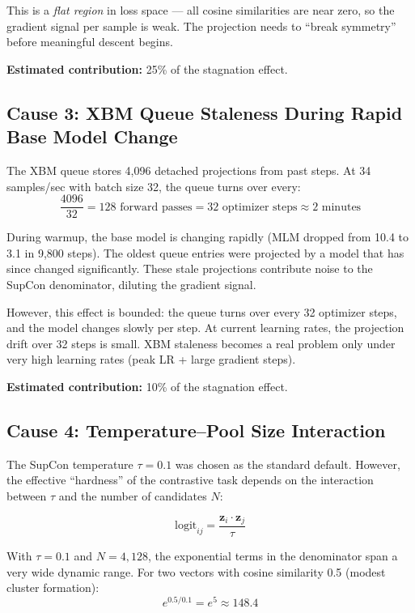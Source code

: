 \documentclass[11pt,a4paper]{article}
\begin{document}
This is a \emph{flat region} in loss space --- all cosine similarities are near zero,
so the gradient signal per sample is weak. The projection needs to ``break symmetry''
before meaningful descent begins.

\medskip
\noindent\textbf{Estimated contribution:} 25\% of the stagnation effect.

\subsection{Cause 3: XBM Queue Staleness During Rapid Base Model Change}
\label{sec:cause3}

The XBM queue stores 4{,}096 detached projections from past steps. At 34\,samples/sec
with batch size 32, the queue turns over every:
\begin{equation}
\frac{4096}{32} = 128 \text{ forward passes} = 32 \text{ optimizer steps} \approx 2 \text{ minutes}
\end{equation}

During warmup, the base model is changing rapidly (MLM dropped from 10.4 to 3.1 in
9{,}800 steps). The oldest queue entries were projected by a model that has since
changed significantly. These stale projections contribute noise to the SupCon
denominator, diluting the gradient signal.

However, this effect is bounded: the queue turns over every 32 optimizer steps, and
the model changes slowly per step. At current learning rates, the projection drift
over 32 steps is small. XBM staleness becomes a real problem only under very high
learning rates (peak LR + large gradient steps).

\medskip
\noindent\textbf{Estimated contribution:} 10\% of the stagnation effect.

\subsection{Cause 4: Temperature--Pool Size Interaction}
\label{sec:cause4}

The SupCon temperature $\tau = 0.1$ was chosen as the standard default. However, the
effective ``hardness'' of the contrastive task depends on the interaction between $\tau$
and the number of candidates $N$:

\begin{equation}
\text{logit}_{ij} = \frac{\mathbf{z}_i \cdot \mathbf{z}_j}{\tau}
\end{equation}

With $\tau = 0.1$ and $N = 4{,}128$, the exponential terms in the denominator span a
very wide dynamic range. For two vectors with cosine similarity 0.5 (modest cluster
formation):
\begin{equation}
e^{0.5/0.1} = e^5 \approx 148.4
\end{equation}
\end{document}
